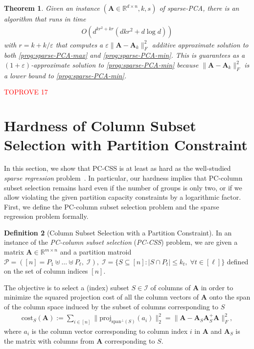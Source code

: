 \documentclass[11pt]{article}
\makeatletter
\newcommand{\sumL}{\sum\limits}
\theoremstyle{plain}
\newtheorem{theorem}{Theorem}[section]
\theoremstyle{plain}
\theoremstyle{definition}
\newtheorem{defn}[theorem]{Definition}
\theoremstyle{plain}
\theoremstyle{remark}
\newenvironment{proof}[1][\protect\proofname]{\par
	\normalfont\topsep6\p@\@plus6\p@\relax
	\trivlist
	\itemindent\parindent
	\item[\hskip\labelsep\scshape #1]\ignorespaces
}{\endtrivlist\@endpefalse
}
\providecommand{\proofname}{Proof}
\newcommand{\RR}{\mathbb{R}}
\newcommand{\cI}{\mathcal{I}}
\newcommand{\cP}{\mathcal{P}}
\DeclareRobustCommand{\fairCSSx}{PC-column subset selection}
\DeclareRobustCommand{\fairCSS}{\mbox{PC-CSS}}
\makeatother
\begin{document}
\begin{theorem}\label{thm:sparse-PCA}
    Given an instance $(\bm{A}\in \RR^{d\times n},k,s)$ of sparse-PCA, there is an algorithm that runs in time 
    \begin{align}
        O\left(d^{kr^2+kr}\left(dkr^2+ d\log d\right)\right)
    \end{align}
with $r=k+k/\varepsilon$ that computes a $\varepsilon \|\bm{A}-\bm{A}_k\|_F^2$ additive approximate solution to both \ref{prog:sparse-PCA-max} and \ref{prog:sparse-PCA-min}. This is guarantees as a $(1+\varepsilon)$-approximate solution to \ref{prog:sparse-PCA-min} because $\|\bm{A}-\bm{A}_k\|_F^2$ is a lower bound to \ref{prog:sparse-PCA-min}. 
\end{theorem}
\begin{proof}\textcolor{red}{TOPROVE 17}\end{proof}


\section{Hardness of Column Subset Selection with Partition Constraint}\label{sec:css-hardness}

In this section, we show that \fairCSS{} is at least as hard as the well-studied \emph{sparse regression} problem~\cite{natarajan1995sparse,FKT15,har2018approximate,gupte2021fine}. In particular, our hardness implies that \fairCSSx{} remains hard even if the number of groups is only two, or if we allow violating the given partition capacity constraints by a logarithmic factor. First, we define the \fairCSSx{} problem and the sparse regression problem formally. 

\begin{defn}[Column Subset Selection with a Partition Constraint]
\label{def:fair-css}
    In an instance of the \emph{\fairCSSx} (\emph{\fairCSS}) problem, we are 
    given a matrix $\bm{A}\in \RR^{m\times n}$ and a partition matroid $\cP=([n]=P_1\uplus\dots \uplus P_{\ell},\;\cI), \; \cI=\{S\subseteq [n]: |S\cap P_{t}|\leq k_{t}, \; \forall t \in [\ell]\}$ defined on the set of column indices $[n]$. 
    
    The objective is to select a (index) subset $S\in \cI$ of columns of $\bm{A}$ in order to minimize the squared projection cost of all the column vectors of $\bm{A}$ onto the span of the column space induced by the subset of columns corresponding to $S$
    \begin{align}
        \text{cost}_{S}(\bm{A}):= \sumL_{i\in [n]}\|\text{proj}_{\text{span}^\bot(S)}(a_i)\|_2^2 = \|\bm{A}-\bm{A}_S\bm{A}_S^+\bm{A}\|_F^2,
\end{align}  
  where $a_i$ is the column vector corresponding to column index $i$ in $\bm{A}$ and $\bm{A}_S$ is the matrix with columns from $\bm{A} $  corresponding to $S$.
\end{defn}
\end{document}
